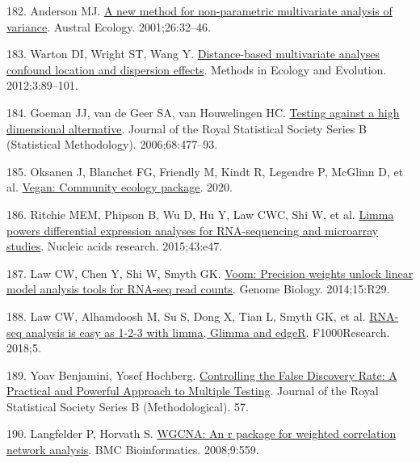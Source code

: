 \documentclass[
  12pt,
  a4paper,
  twoside,
  openright]{book}
\newlength{\cslhangindent}
\newlength{\cslentryspacingunit} %
\newenvironment{CSLReferences}[2] %
 {%
  \setlength{\parindent}{0pt}
  \ifodd #1
  \let\oldpar\par
  \def\par{\hangindent=\cslhangindent\oldpar}
  \fi
  \setlength{\parskip}{#2\cslentryspacingunit}
 }%
 {}
\begin{document}
\begin{CSLReferences}{0}{0}
\leavevmode{}%
182. Anderson MJ. \href{https://doi.org/10.1111/j.1442-9993.2001.01070.pp.x}{A new method for non-parametric multivariate analysis of variance}. Austral Ecology. 2001;26:32--46.

\leavevmode{}%
183. Warton DI, Wright ST, Wang Y. \href{https://doi.org/10.1111/j.2041-210X.2011.00127.x}{Distance-based multivariate analyses confound location and dispersion effects}. Methods in Ecology and Evolution. 2012;3:89--101.

\leavevmode{}%
184. Goeman JJ, van de Geer SA, van Houwelingen HC. \href{https://www.jstor.org/stable/3879286}{Testing against a high dimensional alternative}. Journal of the Royal Statistical Society Series B (Statistical Methodology). 2006;68:477--93.

\leavevmode{}%
185. Oksanen J, Blanchet FG, Friendly M, Kindt R, Legendre P, McGlinn D, et al. \href{https://CRAN.R-project.org/package=vegan}{Vegan: Community ecology package}. 2020.

\leavevmode{}%
186. Ritchie MEM, Phipson B, Wu D, Hu Y, Law CWC, Shi W, et al. \href{https://doi.org/10.1093/nar/gkv007}{Limma powers differential expression analyses for RNA-sequencing and microarray studies}. Nucleic acids research. 2015;43:e47.

\leavevmode{}%
187. Law CW, Chen Y, Shi W, Smyth GK. \href{https://doi.org/10.1186/gb-2014-15-2-r29}{Voom: Precision weights unlock linear model analysis tools for RNA-seq read counts}. Genome Biology. 2014;15:R29.

\leavevmode{}%
188. Law CW, Alhamdoosh M, Su S, Dong X, Tian L, Smyth GK, et al. \href{https://doi.org/10.12688/f1000research.9005.3}{RNA-seq analysis is easy as 1-2-3 with limma, Glimma and edgeR}. F1000Research. 2018;5.

\leavevmode{}%
189. Yoav Benjamini, Yosef Hochberg. \href{http://www.jstor.org/stable/2346101}{Controlling the False Discovery Rate: A Practical and Powerful Approach to Multiple Testing}. Journal of the Royal Statistical Society Series B (Methodological). 57.

\leavevmode{}%
190. Langfelder P, Horvath S. \href{https://doi.org/10.1186/1471-2105-9-559}{WGCNA: An r package for weighted correlation network analysis}. BMC Bioinformatics. 2008;9:559.


\end{CSLReferences}
\end{document}
